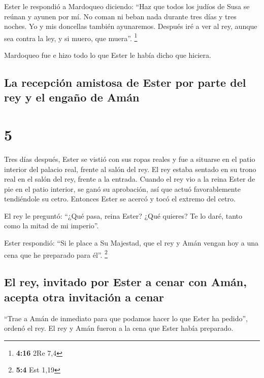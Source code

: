  Ester le respondió a Mardoqueo diciendo: 
``Haz que todos los judíos de Susa se reúnan y ayunen por mí. No coman
ni beban nada durante tres días y tres noches. Yo y mis doncellas
también ayunaremos. Después iré a ver al rey, aunque sea contra la ley,
y si muero, que muera''. \footnote{\textbf{4:16} 2Re 7,4}

 Mardoqueo fue e hizo todo lo que Ester le había dicho
que hiciera.

\hypertarget{la-recepciuxf3n-amistosa-de-ester-por-parte-del-rey-y-el-engauxf1o-de-amuxe1n}{%
\subsection{La recepción amistosa de Ester por parte del rey y el engaño
de
Amán}\label{la-recepciuxf3n-amistosa-de-ester-por-parte-del-rey-y-el-engauxf1o-de-amuxe1n}}

\hypertarget{section-4}{%
\section{5}\label{section-4}}

 Tres días después, Ester se vistió con sus ropas reales y
fue a situarse en el patio interior del palacio real, frente al salón
del rey. El rey estaba sentado en su trono real en el salón del rey,
frente a la entrada.  Cuando el rey vio a la reina Ester
de pie en el patio interior, se ganó su aprobación, así que actuó
favorablemente tendiéndole su cetro. Entonces Ester se acercó y tocó el
extremo del cetro.

 El rey le preguntó: ``¿Qué pasa, reina Ester? ¿Qué
quieres? Te lo daré, tanto como la mitad de mi imperio''.

 Ester respondió: ``Si le place a Su Majestad, que el rey
y Amán vengan hoy a una cena que he preparado para él''. \footnote{\textbf{5:4}
  Est 1,19}

\hypertarget{el-rey-invitado-por-ester-a-cenar-con-amuxe1n-acepta-otra-invitaciuxf3n-a-cenar}{%
\subsection{El rey, invitado por Ester a cenar con Amán, acepta otra
invitación a
cenar}\label{el-rey-invitado-por-ester-a-cenar-con-amuxe1n-acepta-otra-invitaciuxf3n-a-cenar}}

 ``Trae a Amán de inmediato para que podamos hacer lo que
Ester ha pedido'', ordenó el rey. El rey y Amán fueron a la cena que
Ester había preparado.

